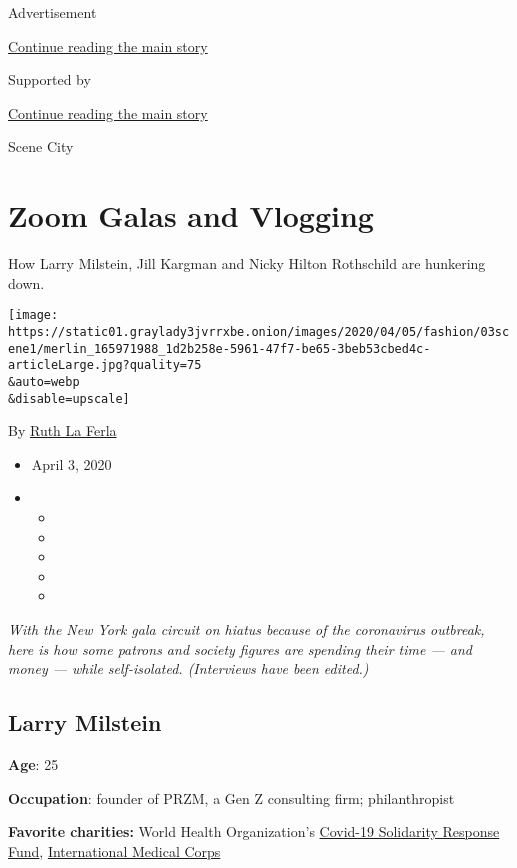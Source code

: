 Advertisement

\protect\hyperlink{after-top}{Continue reading the main story}

Supported by

\protect\hyperlink{after-sponsor}{Continue reading the main story}

Scene City

\hypertarget{zoom-galas-and-vlogging}{%
\section{Zoom Galas and Vlogging}\label{zoom-galas-and-vlogging}}

How Larry Milstein, Jill Kargman and Nicky Hilton Rothschild are
hunkering down.

\texttt{[image: https://static01.graylady3jvrrxbe.onion/images/2020/04/05/fashion/03scene1/merlin\_165971988\_1d2b258e-5961-47f7-be65-3beb53cbed4c-articleLarge.jpg?quality=75\\\&auto=webp\\\&disable=upscale]}

By \href{https://www.nytimes3xbfgragh.onion/by/ruth-la-ferla}{Ruth La
Ferla}

\begin{itemize}
\item
  April 3, 2020
\item
  \begin{itemize}
  \item
  \item
  \item
  \item
  \item
  \end{itemize}
\end{itemize}

\emph{With the New York gala circuit on hiatus because of the
coronavirus outbreak, here is how some patrons and society figures are
spending their time --- and money --- while self-isolated. (Interviews
have been edited.)}

\hypertarget{larry-milstein}{%
\subsection{Larry Milstein}\label{larry-milstein}}

\textbf{Age}: 25

\textbf{Occupation}: founder of PRZM, a Gen Z consulting firm;
philanthropist

\textbf{Favorite charities:} World Health Organization's
\href{https://www.who.int/emergencies/diseases/novel-coronavirus-2019/donate}{Covid-19
Solidarity Response Fund},
\href{https://internationalmedicalcorps.org/}{International Medical
Corps}

